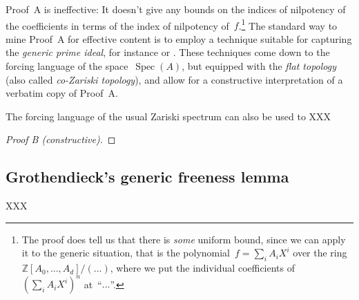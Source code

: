 \documentclass{amsart}
\theoremstyle{definition}
\theoremstyle{plain}
\theoremstyle{remark}
\newcommand{\ZZ}{\mathbb{Z}}
\DeclareMathOperator{\Spec}{Spec}
\newcommand{\?}{\,{:}\,}
\begin{document}
Proof~A is ineffective: It doesn't give any bounds on the indices of nilpotency
of the coefficients in terms of the index of nilpotency of~$f$.\footnote{The
proof does tell us that there is \emph{some} uniform bound, since we can apply
it to the generic situation, that is the polynomial~$f = \sum_i A_i X^i$ over the
ring~$\ZZ[A_0,\ldots,A_d]/(\ldots)$, where we put the individual coefficients of~$(\sum_i
A_i X^i)^n$ at~``$\ldots$''.} The standard way to mine Proof~A for effective
content is to employ a technique suitable for capturing the \emph{generic prime
ideal}, for instance \cite{XXXcoquand} or \cite{XXXschuster}. These techniques
come down to the forcing language of the space~$\Spec(A)$, but equipped with
the \emph{flat topology} (also called \emph{co-Zariski topology}), and allow
for a constructive interpretation of a verbatim copy of Proof~A.

The forcing language of the usual Zariski spectrum can also be used to XXX

\begin{proof}[Proof B (constructive)]
\end{proof}

\subsection{Grothendieck's generic freeness lemma}

XXX
\end{document}
